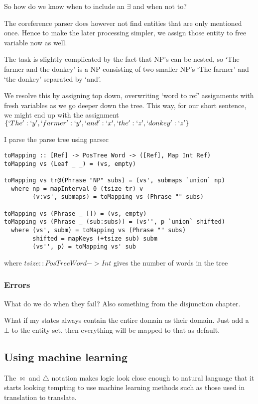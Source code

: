 \documentclass[12pt]{article}
\begin{document}
So how do we know when to include an $\exists$ and when not to?

The coreference parser does however not find entities that are only mentioned once. Hence to make the later processing simpler, we assign those entity to free variable now as well.

The task is slightly complicated by the fact that NP's can be nested, so `The farmer and the donkey' is a NP consisting of two smaller NP's `The farmer' and `the donkey' separated by `and'.

We resolve this by assigning top down, overwriting `word to ref' assignments with fresh variables as we go deeper down the tree. This way, for our short sentence, we might end up with the assignment $\{`The': `y', `farmer': `y', `and': `x', `the': `z', `donkey': `z'\}$

I parse the parse tree using parsec\cite{leijen2001parsec}

\begin{lstlisting}
toMapping :: [Ref] -> PosTree Word -> ([Ref], Map Int Ref)
toMapping vs (Leaf _ _) = (vs, empty)

toMapping vs tr@(Phrase "NP" subs) = (vs', submaps `union` np)
  where np = mapInterval 0 (tsize tr) v
        (v:vs', submaps) = toMapping vs (Phrase "" subs)

toMapping vs (Phrase _ []) = (vs, empty)
toMapping vs (Phrase _ (sub:subs)) = (vs'', p `union` shifted)
  where (vs', subm) = toMapping vs (Phrase "" subs)
        shifted = mapKeys (+tsize sub) subm
        (vs'', p) = toMapping vs' sub
\end{lstlisting}

where $tsize :: PosTree Word -> Int$ gives the number of words in the tree


\subsubsection{Errors}

What do we do when they fail?
Also something from the disjunction chapter.

What if my states always contain the entire domain as their domain. Just add a $\bot$ to the entity set, then everything will be mapped to that as default.

\subsection{Using machine learning}
The $\bowtie$ and $\triangle$ notation makes logic look close enough to natural language that it starts looking tempting to use machine learning methods such as those used in translation to translate.
\end{document}
